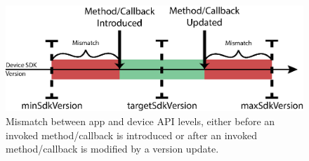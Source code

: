     
\label{API Compatibility Issues}

\begin{figure}%
    \centering
    \includegraphics[width=0.9\columnwidth]{images/api-mismatch} 
    \caption{Mismatch between app and device API levels, either before an invoked method/callback is introduced or after an invoked method/callback is modified by a version update.} 
    \label{fig:api-mismatch} 
\end{figure}

